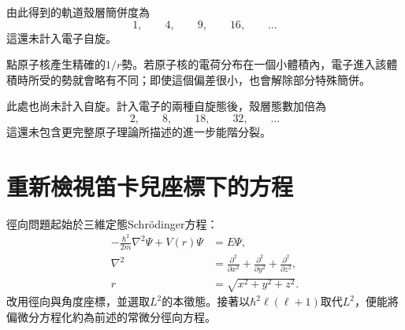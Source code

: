 由此得到的軌道殼層簡併度為
\begin{equation}
1,\qquad 4,\qquad 9,\qquad 16,\qquad \ldots
\end{equation}
這還未計入電子自旋。

\begin{classroomqa}
\end{classroomqa}

點原子核產生精確的\(1/r\)勢。若原子核的電荷分布在一個小體積內，電子進入該體積時所受的勢就會略有不同；即使這個偏差很小，也會解除部分特殊簡併。

此處也尚未計入自旋。計入電子的兩種自旋態後，殼層態數加倍為
\begin{equation}
2,\qquad 8,\qquad 18,\qquad 32,\qquad \ldots
\end{equation}
這還未包含更完整原子理論所描述的進一步能階分裂。

\section{重新檢視笛卡兒座標下的方程}

徑向問題起始於三維定態Schr\"odinger方程：
\begin{equation}
\begin{aligned}
-\frac{\hbar^2}{2m}\nabla^2\Psi+V(r)\Psi&=E\Psi,\\
\nabla^2&=\frac{\partial^2}{\partial x^2}
+\frac{\partial^2}{\partial y^2}
+\frac{\partial^2}{\partial z^2},\\
r&=\sqrt{x^2+y^2+z^2}.
\end{aligned}
\end{equation}
改用徑向與角度座標，並選取\(L^2\)的本徵態。接著以\(\hbar^2\ell(\ell+1)\)取代\(L^2\)，便能將偏微分方程化約為前述的常微分徑向方程。

\begin{classroomqa}
\end{classroomqa}

\begin{classroomqa}
\end{classroomqa}

